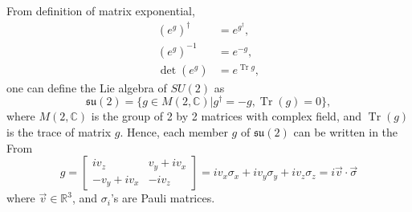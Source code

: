 \documentclass[12pt]{revtex4-2}
\DeclareMathOperator{\Tr}{Tr}
\begin{document}
From definition of matrix exponential,
\begin{equation}
    \begin{aligned}
        (e^g)^\dagger &= e^{g^\dagger}, \\
        (e^g)^{-1} &= e^{-g}, \\
        \det(e^g) &= e^{\Tr g},
    \end{aligned}
\end{equation}
one can define the Lie algebra of $SU(2)$ as
\begin{equation}
    \mathfrak{su(2)} = \{g \in M(2, \mathbb{C})|g^\dagger=-g, \Tr(g) = 0\},
\end{equation}
where $M(2,\mathbb{C})$ is the group of 2 by 2 matrices with complex field, and $\Tr(g)$ is the
trace of matrix $g$. Hence, each member $g$ of $\mathfrak{su(2)}$ can be written in the From
\begin{equation}
    g = \begin{bmatrix}
            iv_z & v_y+iv_x \\
            -v_y+iv_x & -iv_z
        \end{bmatrix}
      = iv_x\sigma_x + iv_y\sigma_y + iv_z\sigma_z = i\vec{v}\cdot\vec{\sigma}
\end{equation}
where $\vec{v} \in \mathbb{R}^3$, and $\sigma_i$'s are Pauli matrices.
\end{document}
